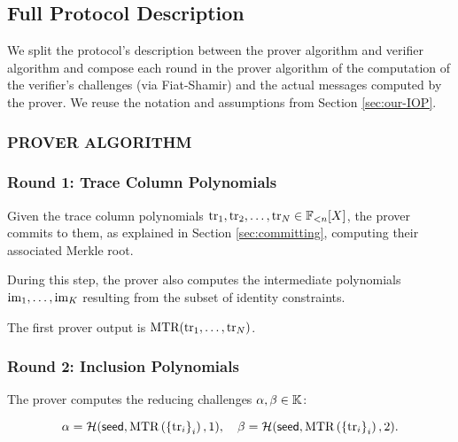 \subsection{Full Protocol Description}

We split the protocol's description between the prover algorithm and verifier algorithm and compose each round in the prover algorithm of the computation of the verifier's challenges (via Fiat-Shamir) and the actual messages computed by the prover. We reuse the notation and assumptions from Section \ref{sec:our-IOP}.

\subsubsection*{PROVER ALGORITHM}

\subsubsection*{Round 1: Trace Column Polynomials}

Given the trace column polynomials $\text{tr}_1,\text{tr}_2,\dots,\text{tr}_N \in \mathbb{F}_{<n}[X]$, the prover commits to them, as explained in Section \ref{sec:committing}, computing their associated Merkle root.

During this step, the prover also computes the intermediate polynomials $\text{im}_1,\dots,\text{im}_K$ resulting from the subset of identity constraints.

The first prover output is $\text{MTR}(\text{tr}_1,\dots,\text{tr}_N)$.


\subsubsection*{Round 2: Inclusion Polynomials}\label{par:round-2}



\ifNOPOLYGON
The prover computes the reducing challenges $\alpha, \beta \in \mathbb{K}$:

\[
  \alpha = \mathcal{H}(\textsf{seed},\text{MTR}\left(\left\{\text{tr}_i\right\}_i\right),1),\quad \beta = \mathcal{H}(\textsf{seed},\text{MTR}\left(\left\{\text{tr}_i\right\}_i\right),2).
\]
\fi

